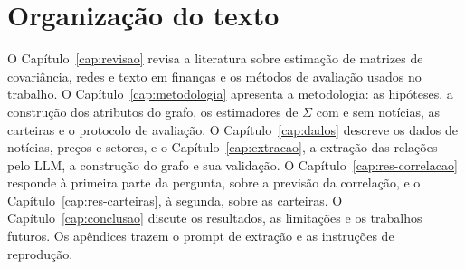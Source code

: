 \section{Organização do texto}
\label{sec:organizacao}

O Capítulo~\ref{cap:revisao} revisa a literatura sobre estimação de matrizes de covariância, redes e
texto em finanças e os métodos de avaliação usados no trabalho. O Capítulo~\ref{cap:metodologia}
apresenta a metodologia: as hipóteses, a construção dos atributos do grafo, os estimadores de $\Sigma$
com e sem notícias, as carteiras e o protocolo de avaliação. O Capítulo~\ref{cap:dados} descreve os
dados de notícias, preços e setores, e o Capítulo~\ref{cap:extracao}, a extração das relações pelo LLM,
a construção do grafo e sua validação. O Capítulo~\ref{cap:res-correlacao} responde à primeira parte da
pergunta, sobre a previsão da correlação, e o Capítulo~\ref{cap:res-carteiras}, à segunda, sobre as
carteiras. O Capítulo~\ref{cap:conclusao} discute os resultados, as limitações e os trabalhos futuros.
Os apêndices trazem o prompt de extração e as instruções de reprodução.

\clearpage
